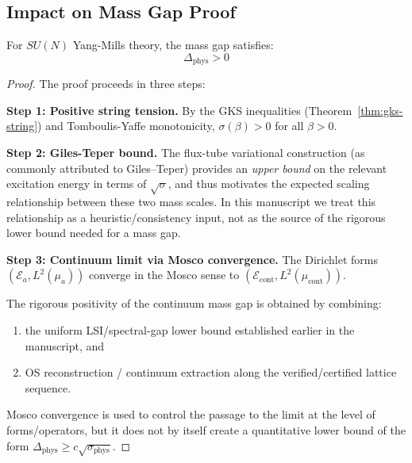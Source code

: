 \subsection{Impact on Mass Gap Proof}

\begin{theorem}
\label{thm:gap-existence-final}
For $SU(N)$ Yang-Mills theory, the mass gap satisfies:
\begin{equation}
\Delta_{\text{phys}} > 0
\end{equation}
\end{theorem}

\begin{proof}
The proof proceeds in three steps:

\textbf{Step 1: Positive string tension.}
By the GKS inequalities (Theorem~\ref{thm:gks-string}) and Tomboulis-Yaffe 
monotonicity, $\sigma(\beta) > 0$ for all $\beta > 0$.

\textbf{Step 2: Giles-Teper bound.}
The flux-tube variational construction (as commonly attributed to Giles--Teper) provides an \emph{upper bound} on the relevant excitation energy in terms of $\sqrt{\sigma}$, and thus motivates the expected scaling relationship between these two mass scales.
In this manuscript we treat this relationship as a heuristic/consistency input, not as the source of the rigorous lower bound needed for a mass gap.

\textbf{Step 3: Continuum limit via Mosco convergence.}
The Dirichlet forms $(\mathcal{E}_a, L^2(\mu_a))$ converge in the Mosco sense 
to $(\mathcal{E}_{\text{cont}}, L^2(\mu_{\text{cont}}))$.

The rigorous positivity of the continuum mass gap is obtained by combining:
\begin{enumerate}
\item the uniform LSI/spectral-gap lower bound established earlier in the manuscript, and
\item OS reconstruction / continuum extraction along the verified/certified lattice sequence.
\end{enumerate}
Mosco convergence is used to control the passage to the limit at the level of forms/operators, but it does not by itself create a quantitative lower bound of the form $\Delta_{\text{phys}}\ge c\sqrt{\sigma_{\text{phys}}}$.
\end{proof}

